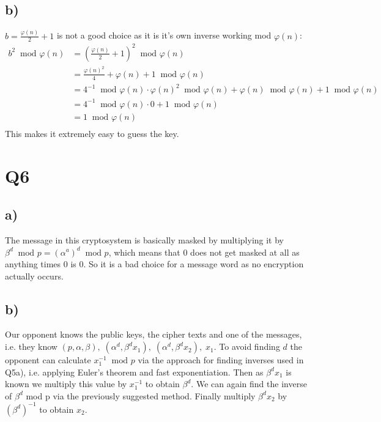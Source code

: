 \documentclass{article}
\begin{document}
\subsection*{b)}
$b=\frac{\varphi(n)}{2}+1$ is not a good choice as it is it's own inverse working mod $\varphi(n)$:
\begin{align*}
b^2\;\;\text{mod }\varphi(n)&=\left(\frac{\varphi(n)}{2}+1\right)^2\;\;\text{mod }\varphi(n)\\
&=\frac{\varphi(n)^2}{4}+\varphi(n)+1\;\;\text{mod }\varphi(n)\\
&=4^{-1}\;\;\text{mod }\varphi(n)\cdot\varphi(n)^2\;\;\text{mod }\varphi(n)+\varphi(n)\;\;\text{mod }\varphi(n)+1\;\;\text{mod }\varphi(n)\\
&=4^{-1}\;\;\text{mod }\varphi(n)\cdot0+1\;\;\text{mod }\varphi(n)\\
&=1\;\;\text{mod }\varphi(n)\\
\end{align*}
This makes it extremely easy to guess the key.
\section*{Q6}
\subsection*{a)}
The message in this cryptosystem is basically masked by multiplying it by $\beta^d\;\;\text{mod }p=(\alpha^a)^d\;\;\text{mod }p$, which means that 0 does not get masked at all as anything times 0 is 0. So it is a bad choice for a message word as no encryption actually occurs.
\subsection*{b)}
Our opponent knows the public keys, the cipher texts and one of the messages, i.e. they know $(p,\alpha,\beta),\;(\alpha^d,\beta^dx_1),\;(\alpha^d,\beta^dx_2),\;x_1$. To avoid finding $d$ the opponent can calculate $x_1^{-1}\;\;\text{mod }p$ via the approach for finding inverses used in Q5a), i.e. applying Euler's theorem and fast exponentiation. Then as $\beta^dx_1$ is known we multiply this value by $x_1^{-1}$ to obtain $\beta^d$. We can again find the inverse of $\beta^d$ mod p via the previously suggested method. Finally multiply $\beta^dx_2$ by $(\beta^d)^{-1}$ to obtain $x_2$.
\end{document}
